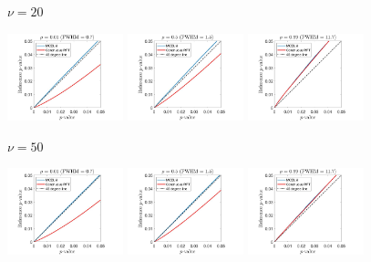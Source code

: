 \documentclass{article}
\begin{document}
\begin{figure}[!htp]
\centering
\begin{sideways}
\phantom{------------------}$\nu = 20$
\end{sideways}
\includegraphics[trim=70 5 100 5, clip,width=0.3\textwidth]{figure/2D_nu20_rho0.01_gauss.jpg}
\includegraphics[trim=70 5 100 5, clip,width=0.3\textwidth]{figure/2D_nu20_rho0.5_gauss.jpg}
\includegraphics[trim=70 5 100 5, clip,width=0.3\textwidth]{figure/2D_nu20_rho0.99_gauss.jpg}

\begin{sideways}
\phantom{------------------}$\nu = 50$
\end{sideways}
\includegraphics[trim=70 5 100 5, clip,width=0.3\textwidth]{figure/2D_nu50_rho0.01_gauss.jpg}
\includegraphics[trim=70 5 100 5, clip,width=0.3\textwidth]{figure/2D_nu50_rho0.5_gauss.jpg}
\includegraphics[trim=70 5 100 5, clip,width=0.3\textwidth]{figure/2D_nu50_rho0.99_gauss.jpg}


\end{figure}
\end{document}
